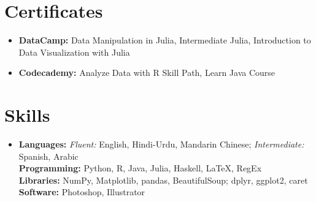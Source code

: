 \documentclass[letterpaper,10pt]{article}
\makeatletter
\newcommand{\resumeItem}[1]{
  \item\small{
    {#1 \vspace{-2pt}}
  }
}
\newcommand{\resumeSubheading}[4]{
    \item\vspace{-2pt}
    \begin{tabular*}{0.97\textwidth}[t]{l@{\extracolsep{\fill}}r}
      \textbf{#1} & #2 \\
      #3 & #4 \\
    \end{tabular*}\vspace{-7pt}
}
\newcommand{\resumeSubHeadingListStart}{\begin{itemize}[leftmargin=0.15in, label=]}
\newcommand{\resumeSubHeadingListEnd}{\end{itemize}}
\makeatother
\begin{document}
\section{Certificates}
\begin{itemize}[leftmargin=0.15in, label={}]
    \resumeItem{\textbf{DataCamp:}{ Data Manipulation in Julia, Intermediate Julia, Introduction to Data Visualization with Julia}}\vspace{-5px}
    \resumeItem{\textbf{Codecademy:}{ Analyze Data with R Skill Path, Learn Java Course}}
\end{itemize}







\section{Skills}
\begin{itemize}[leftmargin=0.15in, label={}]
    \small\item{
    \textbf{Languages:} \emph{Fluent:} English, Hindi-Urdu, Mandarin Chinese; \emph{Intermediate:} Spanish, Arabic \\
    \textbf{Programming:} Python, R, Java, Julia, Haskell, \LaTeX, RegEx \\
    \textbf{Libraries:} NumPy, Matplotlib, pandas, BeautifulSoup; dplyr, ggplot2, caret \\
    \textbf{Software:} Photoshop, Illustrator
    }
\end{itemize}


\end{document}
